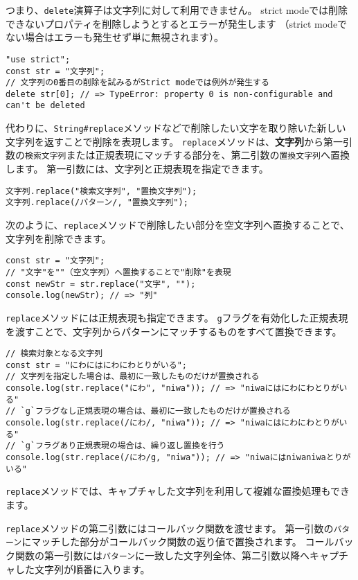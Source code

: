 つまり、\texttt{delete}演算子は文字列に対して利用できません。
strict
modeでは削除できないプロパティを削除しようとするとエラーが発生します
（strict modeでない場合はエラーも発生せず単に無視されます）。

\begin{lstlisting}
"use strict";
const str = "文字列";
// 文字列の0番目の削除を試みるがStrict modeでは例外が発生する
delete str[0]; // => TypeError: property 0 is non-configurable and can't be deleted
\end{lstlisting}

代わりに、\texttt{String\#replace}メソッドなどで削除したい文字を取り除いた新しい文字列を返すことで削除を表現します。
\texttt{replace}メソッドは、\textbf{文字列}から第一引数の\texttt{検索文字列}または正規表現にマッチする部分を、第二引数の\texttt{置換文字列}へ置換します。
第一引数には、文字列と正規表現を指定できます。

\begin{lstlisting}
文字列.replace("検索文字列", "置換文字列");
文字列.replace(/パターン/, "置換文字列");
\end{lstlisting}

次のように、\texttt{replace}メソッドで削除したい部分を空文字列へ置換することで、文字列を削除できます。

\begin{lstlisting}
const str = "文字列";
// "文字"を""（空文字列）へ置換することで"削除"を表現
const newStr = str.replace("文字", "");
console.log(newStr); // => "列"
\end{lstlisting}

\texttt{replace}メソッドには正規表現も指定できます。
\texttt{g}フラグを有効化した正規表現を渡すことで、文字列からパターンにマッチするものをすべて置換できます。

\begin{lstlisting}
// 検索対象となる文字列
const str = "にわにはにわにわとりがいる";
// 文字列を指定した場合は、最初に一致したものだけが置換される
console.log(str.replace("にわ", "niwa")); // => "niwaにはにわにわとりがいる"
// `g`フラグなし正規表現の場合は、最初に一致したものだけが置換される
console.log(str.replace(/にわ/, "niwa")); // => "niwaにはにわにわとりがいる"
// `g`フラグあり正規表現の場合は、繰り返し置換を行う
console.log(str.replace(/にわ/g, "niwa")); // => "niwaにはniwaniwaとりがいる"
\end{lstlisting}

\texttt{replace}メソッドでは、キャプチャした文字列を利用して複雑な置換処理もできます。

\texttt{replace}メソッドの第二引数にはコールバック関数を渡せます。
第一引数の\texttt{パターン}にマッチした部分がコールバック関数の返り値で置換されます。
コールバック関数の第一引数には\texttt{パターン}に一致した文字列全体、第二引数以降へキャプチャした文字列が順番に入ります。

